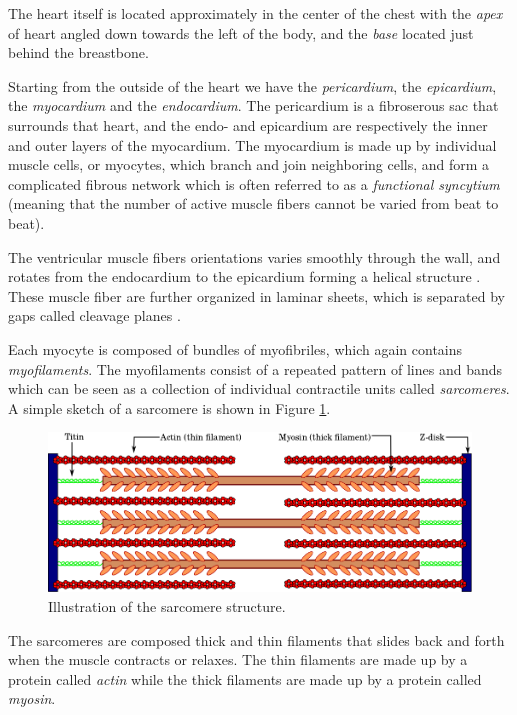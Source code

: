 The heart itself is located approximately in the center of the chest
with the \emph{apex} of heart angled down towards the left of the
body, and the \emph{base} located just behind the breastbone.


Starting from the outside of the heart we have the \emph{pericardium},
the \emph{epicardium}, the \emph{myocardium} and the \emph{endocardium}. 
The pericardium is a fibroserous sac that surrounds that heart, and
the endo- and epicardium are respectively the inner and outer layers
of the myocardium. The myocardium is made up by individual muscle cells, or
myocytes, which branch and join neighboring cells, and form a
complicated fibrous network which is often referred to as a 
\emph{functional syncytium} (meaning that the number of active muscle
fibers cannot be varied from beat to beat).

The ventricular muscle fibers orientations varies smoothly through the
wall, and rotates from the endocardium to the epicardium forming a
helical structure \cite{streeter1969fiber}. These muscle fiber are
further organized in laminar sheets, which is separated by gaps called
cleavage planes \cite{legrice1995laminar}.

Each myocyte is composed of bundles of myofibriles, which again contains
\emph{myofilaments}. The myofilaments consist of a repeated pattern
of lines and bands which can be seen as a collection of individual
contractile units called \emph{sarcomeres}. A simple sketch of a
sarcomere is shown in Figure \ref{fig:sarcomere}. 
\begin{figure}[htbp]
  \centering
    \includegraphics{chapters/introduction/figures/Sarcomere}
\caption{Illustration of the sarcomere structure.}
\label{fig:sarcomere}
\end{figure}

The sarcomeres are composed thick and thin filaments that slides
back and forth when the muscle contracts or relaxes.
The thin filaments are made up by a protein called \emph{actin} while
the thick filaments are made up by a protein called \emph{myosin}.



